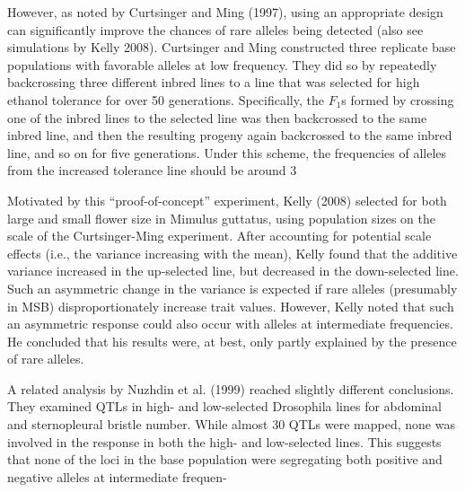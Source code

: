 \documentclass{article}
\begin{document}
However, as noted by Curtsinger and Ming (1997), using an appropriate design can significantly improve the chances of rare alleles being detected (also see simulations by Kelly 2008). Curtsinger and Ming constructed three replicate base populations with favorable alleles at low frequency. They did so by repeatedly backcrossing three different inbred lines to a line that was selected for high ethanol tolerance for over 50 generations. Specifically, the  $ F_{1} $s formed by crossing one of the inbred lines to the selected line was then backcrossed to the same inbred line, and then the resulting progeny again backcrossed to the same inbred line, and so on for five generations. Under this scheme, the frequencies of alleles from the increased tolerance line should be around 3%

Motivated by this “proof-of-concept” experiment, Kelly (2008) selected for both large and small flower size in Mimulus guttatus, using population sizes on the scale of the Curtsinger-Ming experiment. After accounting for potential scale effects (i.e., the variance increasing with the mean), Kelly found that the additive variance increased in the up-selected line, but decreased in the down-selected line. Such an asymmetric change in the variance is expected if rare alleles (presumably in MSB) disproportionately increase trait values. However, Kelly noted that such an asymmetric response could also occur with alleles at intermediate frequencies. He concluded that his results were, at best, only partly explained by the presence of rare alleles.

A related analysis by Nuzhdin et al. (1999) reached slightly different conclusions. They examined QTLs in high- and low-selected Drosophila lines for abdominal and sternopleural bristle number. While almost 30 QTLs were mapped, none was involved in the response in both the high- and low-selected lines. This suggests that none of the loci in the base population were segregating both positive and negative alleles at intermediate frequen-
\end{document}
